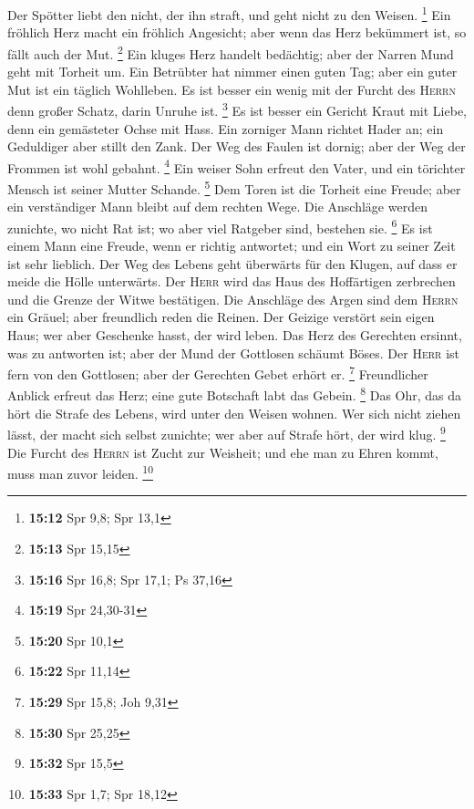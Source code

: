  Der Spötter liebt den nicht, der ihn straft, und geht
nicht zu den Weisen. \footnote{\textbf{15:12} Spr 9,8; Spr 13,1}
 Ein fröhlich Herz macht ein fröhlich Angesicht; aber
wenn das Herz bekümmert ist, so fällt auch der Mut. \footnote{\textbf{15:13}
  Spr 15,15}  Ein kluges Herz handelt bedächtig; aber der
Narren Mund geht mit Torheit um.  Ein Betrübter hat
nimmer einen guten Tag; aber ein guter Mut ist ein täglich Wohlleben.
 Es ist besser ein wenig mit der Furcht des
\textsc{Herrn} denn großer Schatz, darin Unruhe ist. \footnote{\textbf{15:16}
  Spr 16,8; Spr 17,1; Ps 37,16}  Es ist besser ein
Gericht Kraut mit Liebe, denn ein gemästeter Ochse mit Hass.
 Ein zorniger Mann richtet Hader an; ein Geduldiger aber
stillt den Zank.  Der Weg des Faulen ist dornig; aber der
Weg der Frommen ist wohl gebahnt. \footnote{\textbf{15:19} Spr 24,30-31}
 Ein weiser Sohn erfreut den Vater, und ein törichter
Mensch ist seiner Mutter Schande. \footnote{\textbf{15:20} Spr 10,1}
 Dem Toren ist die Torheit eine Freude; aber ein
verständiger Mann bleibt auf dem rechten Wege.  Die
Anschläge werden zunichte, wo nicht Rat ist; wo aber viel Ratgeber sind,
bestehen sie. \footnote{\textbf{15:22} Spr 11,14}  Es ist
einem Mann eine Freude, wenn er richtig antwortet; und ein Wort zu
seiner Zeit ist sehr lieblich.  Der Weg des Lebens geht
überwärts für den Klugen, auf dass er meide die Hölle unterwärts.
 Der \textsc{Herr} wird das Haus des Hoffärtigen
zerbrechen und die Grenze der Witwe bestätigen.  Die
Anschläge des Argen sind dem \textsc{Herrn} ein Gräuel; aber freundlich
reden die Reinen.  Der Geizige verstört sein eigen Haus;
wer aber Geschenke hasst, der wird leben.  Das Herz des
Gerechten ersinnt, was zu antworten ist; aber der Mund der Gottlosen
schäumt Böses.  Der \textsc{Herr} ist fern von den
Gottlosen; aber der Gerechten Gebet erhört er. \footnote{\textbf{15:29}
  Spr 15,8; Joh 9,31}  Freundlicher Anblick erfreut das
Herz; eine gute Botschaft labt das Gebein. \footnote{\textbf{15:30} Spr
  25,25}  Das Ohr, das da hört die Strafe des Lebens,
wird unter den Weisen wohnen.  Wer sich nicht ziehen
lässt, der macht sich selbst zunichte; wer aber auf Strafe hört, der
wird klug. \footnote{\textbf{15:32} Spr 15,5}  Die Furcht
des \textsc{Herrn} ist Zucht zur Weisheit; und ehe man zu Ehren kommt,
muss man zuvor leiden. \footnote{\textbf{15:33} Spr 1,7; Spr 18,12}

